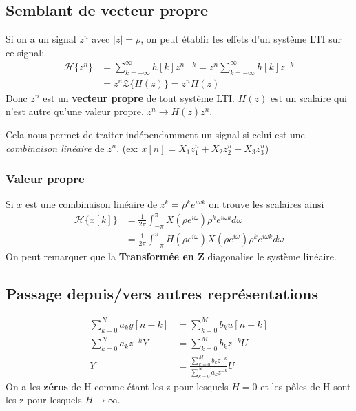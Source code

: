 \documentclass{report}
\begin{document}
\subsection{Semblant de vecteur propre}
Si on a un signal $z^n$ avec $|z| = \rho$, on peut établir les effets d'un système LTI sur ce signal:
\begin{align*}
\mathcal{H}\{z^n\} &= \sum_{k=-\infty}^{\infty} h[k]z^{n-k} = z^n \sum_{k=-\infty}^{\infty} h[k] z^{-k}\\
&= z^n \mathcal{Z}\{H(z)\} = z^n H(z)
\end{align*}
Donc $z^n$ est un \textbf{vecteur propre} de tout système LTI. $H(z)$ est un scalaire qui n'est autre qu'une valeur propre. $z^n \rightarrow H(z) z^n$.\par
Cela nous permet de traiter indépendamment un signal si celui est une \textit{combinaison linéaire} de $z^n$. (ex: $x[n] = X_1 z_1^n + X_2 z_2^n + X_3 z_3^n$)

\subsubsection{Valeur propre} 
Si $x$ est une combinaison linéaire de $z^k = \rho^k e^{i \omega k}$ on trouve les scalaires ainsi
\begin{align*}
\mathcal{H}\{x[k]\} &= \frac{1}{2 \pi} \int_{- \pi}^{\pi} X( \rho e^{i \omega}) \rho^k e^{i \omega k} d \omega\\
&= \frac{1}{2 \pi} \int_{- \pi}^{\pi} H(\rho e^{i \omega}) X(\rho e^{i \omega}) \rho^k e^{i \omega k} d\omega
\end{align*}
On peut remarquer que la \textbf{Transformée en Z} diagonalise le système linéaire.

\subsection{Passage depuis/vers autres représentations}
\begin{align*}
\sum_{k=0}^N a_k y[n-k] &= \sum_{k=0}^M b_k u[n-k]\\
\sum_{k=0}^N a_k \textbf{$z^{-k}$} Y &= \sum_{k=0}^M b_k \textbf{$z^{-k}$} U\\
Y &= \frac{\sum_{k=0}^M b_k \textbf{$z^{-k}$}}{\sum_{k=0}^N a_k \textbf{$z^{-k}$}} U
\end{align*}
On a les \textbf{zéros} de H comme étant les z pour lesquels $H = 0$ et les pôles de H sont les z pour lesquels $H \rightarrow \infty$.
\end{document}
